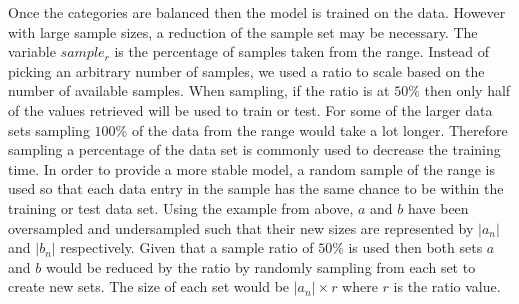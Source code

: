 Once the categories are balanced then the model is trained on the data. However with large sample sizes, a reduction of the sample set may be necessary. The variable $sample_r$ is the percentage of samples taken from the range. Instead of picking an arbitrary number of samples, we used a ratio to scale based on the number of available samples. When sampling, if the ratio is at $50\%$ then only half of the values retrieved will be used to train or test. For some of the larger data sets sampling $100\%$ of the data from the range would take a lot longer. Therefore sampling a percentage of the data set is commonly used to decrease the training time. In order to provide a more stable model, a random sample of the range is used so that each data entry in the sample has the same chance to be within the training or test data set. Using the example from above, $a$ and $b$ have been oversampled and undersampled such that their new sizes are represented by $|a_n|$ and $|b_n|$ respectively. Given that a sample ratio of $50\%$ is used then both sets $a$ and $b$ would be reduced by the ratio by randomly sampling from each set to create new sets. The size of each set would be $|a_n| \times r$ where $r$ is the ratio value.

%

